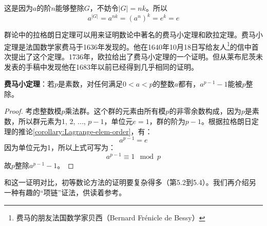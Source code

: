 \documentclass{article}
\begin{document}
这是因为$a$的阶$n$能够整除$G$，不妨令$|G| = nk$。所以
\[
a^{|G|} = a^{nk} = (a^n)^k = e^k = e
\]

群论中的拉格朗日定理可以用来证明数论中著名的费马小定理和欧拉定理。费马小定理是法国数学家费马于1636年发现的。他在1640年10月18日写给友人\footnote{费马的朋友法国数学家贝西（Bernard Frénicle de Bessy）}的信中首次提出了这个定理。1736年，欧拉给出了费马小定理的一个证明。但从莱布尼茨未发表的手稿中发现他在1683年以前已经得到几乎相同的证明。

\begin{theorem}
\textbf{费马小定理}：若$p$是素数，对任何满足$0 < a < p$的整数$a$都有，$a^{p-1}-1$能被$p$整除。
\end{theorem}

\begin{proof}
考虑整数模$p$乘法群。这个群的元素由所有模$p$的非零余数构成，因为$p$是素数，所以群元素为1, 2, ..., $p-1$，单位元$e = 1$，群的阶为$p-1$。根据拉格朗日定理的推论\ref{corollary:Lagrange-elem-order}，有：
\[
a^{p-1} = e
\]
因为单位元为1，所以上式可写为：
\[
a^{p-1} \equiv 1 \mod p
\]
故$p$整除$a^{p-1} - 1$。
\end{proof}

和这一证明对比，初等数论方法的证明要复杂得多（\cite{StepanovRose15}第5.2到5.4）。我们再介绍另一种有趣的“项链”证法\cite{Wiki-FLT-proof}，供读着参考。
\end{document}

